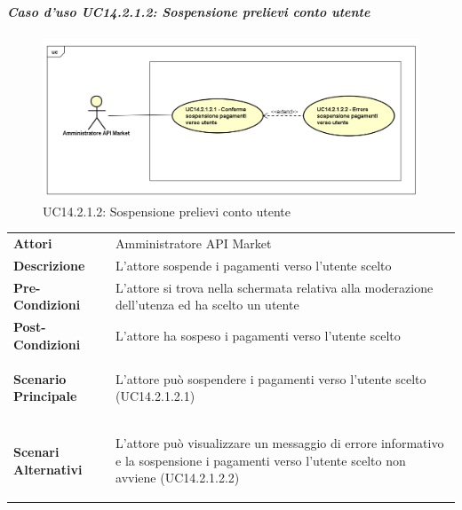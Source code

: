 \newpage
\subparagraph{Caso d'uso UC14.2.1.2: Sospensione prelievi conto utente}
\label{UC14_2_1_2}
\begin{figure}[ht]
	\centering
	\includegraphics[scale=0.45]{UML/UC14_2_1_2.png}
	\caption{UC14.2.1.2: Sospensione prelievi conto utente}
\end{figure}

\begin{minipage}{\linewidth}
	\begin{tabular}{ l | p{11cm}}
		\hline
		\rowcolor{Gray}
		\multicolumn{2}{c}{UC14.2.1.2 - Sospensione prelievi conto utente} \\
		\hline
		\textbf{Attori} & Amministratore API Market \\
		\textbf{Descrizione} & L'attore sospende i pagamenti verso l'utente scelto \\
		\textbf{Pre-Condizioni} & L'attore si trova nella schermata relativa alla moderazione dell'utenza ed ha scelto un utente \\
		\textbf{Post-Condizioni} & L'attore ha sospeso i pagamenti verso l'utente scelto \\
		\textbf{Scenario Principale} & 
		\begin{enumerate*}[label=(\arabic*.),itemjoin={\newline}]
			\item L'attore può sospendere i pagamenti verso l'utente scelto (UC14.2.1.2.1)
		\end{enumerate*}\\
		\textbf{Scenari Alternativi} & 
		\begin{enumerate*}[label=(\arabic*.),itemjoin={\newline}]
			\item L'attore può visualizzare un messaggio di errore informativo e la sospensione i pagamenti verso l'utente scelto non avviene (UC14.2.1.2.2)
		\end{enumerate*}\\
	\end{tabular}
\end{minipage}

